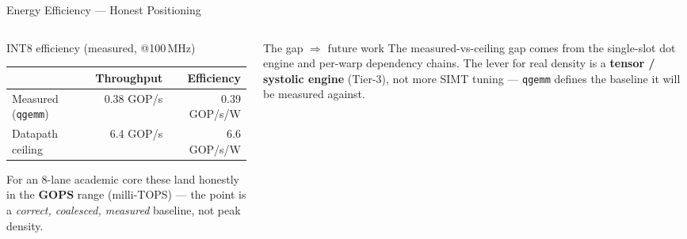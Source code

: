 \documentclass[aspectratio=169,11pt]{beamer}
\newcommand{\hl}[1]{{\color{simtixaccent}\textbf{#1}}}
\begin{document}
\begin{frame}{Energy Efficiency --- Honest Positioning}
  \begin{columns}[T]
    \begin{column}{0.55\textwidth}
      \begin{block}{INT8 efficiency (measured, @100\,MHz)}
        \small
        \begin{tabular}{@{}lrr@{}}
          \toprule
          & Throughput & Efficiency \\
          \midrule
          Measured (\texttt{qgemm}) & 0.38 GOP/s & 0.39 GOP/s/W \\
          Datapath ceiling          & 6.4 GOP/s  & 6.6 GOP/s/W \\
          \bottomrule
        \end{tabular}
      \end{block}
      \vspace{0.2em}
      {\footnotesize For an 8-lane academic core these land honestly in the \hl{GOPS} range
      (milli-TOPS) --- the point is a \emph{correct, coalesced, measured} baseline, not peak density.}
    \end{column}
    \begin{column}{0.45\textwidth}
      \begin{block}{The gap $\Rightarrow$ future work}
        \small The measured-vs-ceiling gap comes from the single-slot dot engine and per-warp
        dependency chains. The lever for real density is a \hl{tensor / systolic engine}
        (Tier-3), not more SIMT tuning --- \texttt{qgemm} defines the baseline it will be measured
        against.
      \end{block}
    \end{column}
  \end{columns}
\end{frame}
\end{document}
